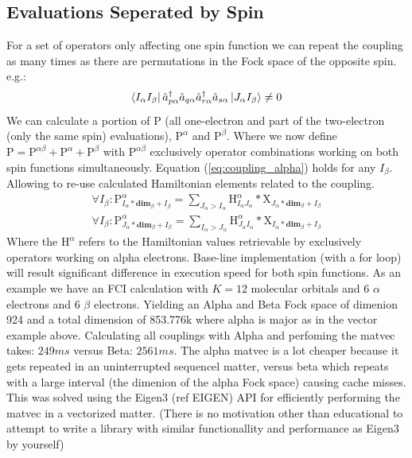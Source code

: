 \documentclass[12p]{article}
\begin{document}
\subsection{Evaluations Seperated by Spin}
For a set of operators only affecting one spin function we can repeat the coupling as many times as there are permutations in the Fock space of the opposite spin. e.g.:
\begin{equation} \label{eq:coupling_alpha}
  \bra{I_\alpha I_\beta} \hat{a}^{\dagger}_{p \alpha} \hat{a}_{q \alpha} \hat{a}^{\dagger}_{r \alpha} \hat{a}_{s \alpha} \ket{J_\alpha I_\beta} \neq 0
\end{equation}
We can calculate a portion of P (all one-electron and part of the two-electron (only the same spin) evaluations), $\text{P}^{\alpha}$ and $\text{P}^{\beta}$.
Where we now define $\text{P} = \text{P}^{\alpha \beta} + \text{P}^{\alpha} + \text{P}^{\beta}$ with $\text{P}^{\alpha \beta}$ exclusively operator combinations working on both spin functions simultaneously.
Equation (\ref{eq:coupling_alpha}) holds for any $I_\beta$.
Allowing to re-use calculated Hamiltonian elements related to the coupling.
\begin{align}
  \forall I_\beta: \text{P}^{\alpha}_{I_\alpha * \textbf{dim}_\beta + I_\beta} = \sum_{J_\alpha > I_\alpha} \text{H}^{\alpha}_{I_\alpha J_\alpha} * \text{X}_{J_\alpha * \textbf{dim}_\beta + I_\beta} \\
  \forall I_\beta: \text{P}^{\alpha}_{J_\alpha * \textbf{dim}_\beta + I_\beta} = \sum_{I_\alpha > J_\alpha} \text{H}^{\alpha}_{J_\alpha I_\alpha} * \text{X}_{I_\alpha * \textbf{dim}_\beta + I_\beta}
\end{align}
Where the $\text{H}^{\alpha}$ refers to the Hamiltonian values retrievable by exclusively operators working on alpha electrons.
Base-line implementation (with a for loop) will result significant difference in execution speed for both spin functions.
As an example we have an FCI calculation with $K=12$ molecular orbitals and 6 $\alpha$ electrons and 6 $\beta$ electrons.
Yielding an Alpha and Beta Fock space of dimenion 924 and a total dimension of 853.776k where alpha is major as in the vector example above.
Calculating all couplings with Alpha and perfoming the matvec takes: $249 ms$ versus Beta: $2561 ms$.
The alpha matvec is a lot cheaper because it gets repeated in an uninterrupted sequencel matter, versus beta which repeats with a large interval (the dimenion of the alpha Fock space) causing cache misses. This was solved using the Eigen3 (ref EIGEN) API for efficiently performing the matvec in a vectorized matter. (There is no motivation other than educational to attempt to write a library with similar functionallity and performance as Eigen3 by yourself)
\end{document}
